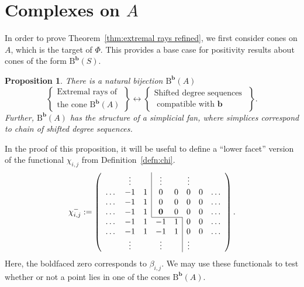 \documentclass[12pt]{amsart}
\newtheorem{prop}[lemma]{Proposition}
\theoremstyle{definition}
\theoremstyle{remark}
\newcommand{\rank}{\operatorname{rank}}
\newcommand{\ZZ}{\mathbb{Z}}
\newcommand{\bb}{\mathbf{b}}
\newcommand{\FF}{\mathbf{F}}
\newcommand{\DD}{\mathrm{D}}
\newcommand{\BBQ}{\mathrm{B}}
\begin{document}
\section{Complexes on $A$}\label{sec:A}
In order to prove Theorem~\ref{thm:extremal rays refined}, we first consider cones on $A$, which is the target of $\Phi$.  
This  provides a base case for positivity results about cones of the form $\BBQ^{\bb}(S)$.

\begin{prop}\label{prop:conePP0 refined}
There is a natural bijection $\BBQ^{\bb}(A)$
\[
\left\{
\begin{matrix}
\text{Extremal rays of }\\
\text{the cone } \BBQ^{\bb}(A)
\end{matrix}
\right\}
\longleftrightarrow
\left\{
\begin{matrix}
\text{Shifted degree sequences }\\
\text{ compatible with $\bb$}
\end{matrix}
\right\}.
\]
Further, $\BBQ^{\bb}(A)$ has the structure of a simplicial fan, where simplices correspond to chain of shifted degree sequences.  
\end{prop}
In the proof of this proposition, it will be useful to define a ``lower facet'' version of the functional $\chi_{i,j}$ from Definition~\ref{defn:chi}.
\[
\chi^{-}_{i,j}:=
\left(
\begin{array}{cccccccc}
 & \vdots& &\multicolumn{1}{|c}{\vdots}&& \vdots&&\\
\dots&-1&1&\multicolumn{1}{|c}{0}&0&0&0&\dots\\
\dots&-1&1&\multicolumn{1}{|c}{0}&0&0&0&\dots\\
\dots&-1&1&\multicolumn{1}{|c}{\mathbf{0}}&0&0&0&\dots\\ \cline{4-5}
\dots&-1&1&-1&1&\multicolumn{1}{|c}{0}&0&\dots\\
\dots&-1&1&-1&1&\multicolumn{1}{|c}{0}&0&\dots\\
& \vdots&&\vdots&& \multicolumn{1}{|c}{\vdots}&&\\
\end{array}
\right).
\]
Here, the boldfaced zero corresponds to $\beta_{i,j}$.  We may use these functionals to test whether or not a point lies in one of the cones $\BBQ^{\bb}(A)$.
\end{document}
